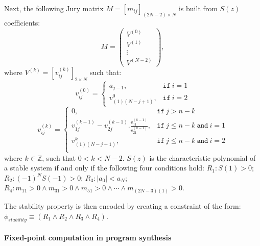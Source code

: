 \documentclass{sig-alternate-05-2015}
\newcommand{\red}[1]{{\color{red}#1}}
\begin{document}
Next, the following Jury matrix
$M = [m_{ij}]_{(2N−2)\times N}$ is built from $S(z)$ coefficients:
%
$$
M=\left( 
\begin{array}{c}
V^{(0)}\\
V^{(1)}\\
\vdots\\
V^{(N-2)}
\end{array}
\right), 
$$
%
where $V^{(k)} = [v^{(k)}_{ij} ]_{2\times N}$ such that:
%
$$
v_{ij}^{(0)}=\left\{
\begin{array}{ll}
a_{j-1}, & \texttt{if}~i=1\\
v_{(1)(N-j+1)}^{0},&\texttt{if}~i=2
\end{array}
\right.
$$
%
$$
v_{ij}^{(k)}=\left\{
\begin{array}{ll}
0,&\texttt{if}~j>n-k\\
v_{1j}^{(k-1)}-v_{2j}^{(k-1)} . \frac{v_{11}^{(k-1)}}{v_{21}^{(k-1)}}, & \texttt{if}~j\leq n-k ~\texttt{and}~i=1\\
v_{(1)(N-j+1)}^{k},& \texttt{if}~j\leq n-k ~\texttt{and}~i=2\\
\end{array}
\right.
$$
%
where $k \in \mathbb{Z}$, such that $0 < k < N - 2$. 
$S(z)$ is the
characteristic polynomial of a stable system if and only if the following four conditions hold:
$R_1: S(1) > 0$;
$R_2: (−1)^N S(−1) > 0$;
$R_3: |a_0| < a_N$;
$R_4: m_{11} > 0 \wedge m_{31}>0 \wedge m_{51}>0 \wedge \cdots \wedge m_{(2N{-}3)(1)}>0$.

The stability property is then encoded by creating a
constraint of the form:
$
\phi_\mathit{stability} \equiv (R_1 \wedge R_2 \wedge R_3 \wedge R_4).
$


\paragraph{Fixed-point computation in program synthesis}
\end{document}
